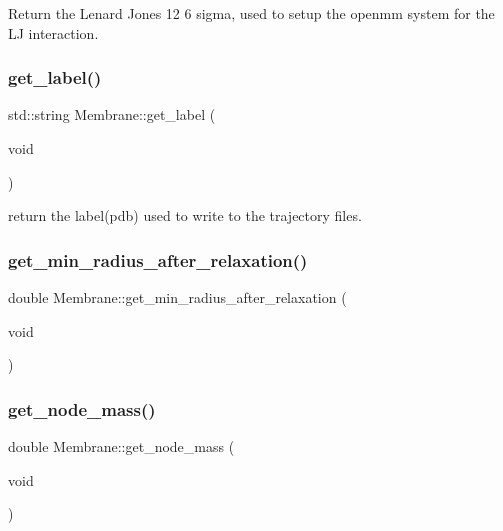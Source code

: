 Return the Lenard Jones 12 6 sigma, used to setup the openmm system for the LJ interaction. \mbox{\label{classMembrane_ad59ce2bce11ba48c2a0fc0a86cfca6eb}} 
\subsubsection{\texorpdfstring{get\_label()}{get\_label()}}
{\footnotesize\ttfamily std\+::string Membrane\+::get\+\_\+label (\begin{DoxyParamCaption}\item[{void}]{ }\end{DoxyParamCaption})\hspace{0.3cm}{\ttfamily [inline]}}

return the label(pdb) used to write to the trajectory files. \mbox{\label{classMembrane_a629f4f8d87ef7b83130cf18e8de060bb}} 
\subsubsection{\texorpdfstring{get\_min\_radius\_after\_relaxation()}{get\_min\_radius\_after\_relaxation()}}
{\footnotesize\ttfamily double Membrane\+::get\+\_\+min\+\_\+radius\+\_\+after\+\_\+relaxation (\begin{DoxyParamCaption}\item[{void}]{ }\end{DoxyParamCaption})\hspace{0.3cm}{\ttfamily [inline]}}

\mbox{\label{classMembrane_a7b6e284f4bba349da2ddc1c14f914dc7}} 
\subsubsection{\texorpdfstring{get\_node\_mass()}{get\_node\_mass()}}
{\footnotesize\ttfamily double Membrane\+::get\+\_\+node\+\_\+mass (\begin{DoxyParamCaption}\item[{void}]{ }\end{DoxyParamCaption})\hspace{0.3cm}{\ttfamily [inline]}}

